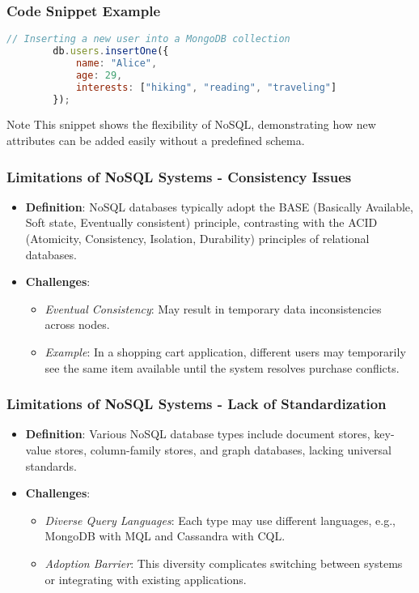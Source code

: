 \documentclass[aspectratio=169]{beamer}
\begin{document}
\begin{frame}[fragile]
    \frametitle{Code Snippet Example}
    \begin{lstlisting}[language=JavaScript]
        // Inserting a new user into a MongoDB collection
        db.users.insertOne({
            name: "Alice",
            age: 29,
            interests: ["hiking", "reading", "traveling"]
        });
    \end{lstlisting}
    \begin{block}{Note}
        This snippet shows the flexibility of NoSQL, demonstrating how new attributes can be added easily without a predefined schema.
    \end{block}
\end{frame}

\begin{frame}[fragile]
    \frametitle{Limitations of NoSQL Systems - Consistency Issues}
    \begin{itemize}
        \item \textbf{Definition}: NoSQL databases typically adopt the BASE (Basically Available, Soft state, Eventually consistent) principle, contrasting with the ACID (Atomicity, Consistency, Isolation, Durability) principles of relational databases.
        \item \textbf{Challenges}:
            \begin{itemize}
                \item \textit{Eventual Consistency}: May result in temporary data inconsistencies across nodes.
                \item \textit{Example}: In a shopping cart application, different users may temporarily see the same item available until the system resolves purchase conflicts.
            \end{itemize}
    \end{itemize}
\end{frame}

\begin{frame}[fragile]
    \frametitle{Limitations of NoSQL Systems - Lack of Standardization}
    \begin{itemize}
        \item \textbf{Definition}: Various NoSQL database types include document stores, key-value stores, column-family stores, and graph databases, lacking universal standards.
        \item \textbf{Challenges}:
            \begin{itemize}
                \item \textit{Diverse Query Languages}: Each type may use different languages, e.g., MongoDB with MQL and Cassandra with CQL.
                \item \textit{Adoption Barrier}: This diversity complicates switching between systems or integrating with existing applications.
            \end{itemize}
    \end{itemize}
\end{frame}
\end{document}
